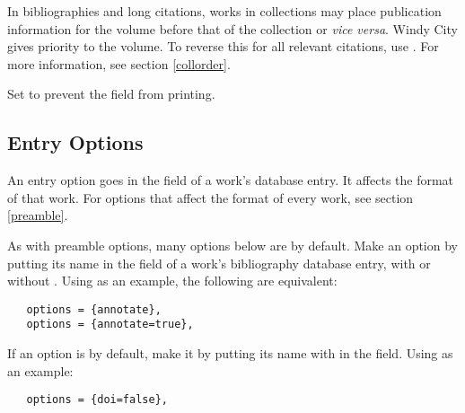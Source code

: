\documentclass[11pt,letterpaper,oneside]{article}
\begin{document}
\begin{optionlist}

\noindent In bibliographies and long citations, works in collections
may place publication information for the volume before that of the
collection or \textit{vice versa}. Windy City gives priority to the
volume. To reverse this for all relevant citations, use .
For more information, see section \ref{collorder}.


\noindent Set  to prevent the  field from
printing.

\end{optionlist}

\subsection{Entry Options}
\label{entry}

An entry option goes in the  field of a work's
database entry. It affects the format of that work. For options that
affect the format of every work, see section \ref{preamble}.

As with preamble options, many options below are  by
default. Make an option  by putting its name in the
 field of a work's bibliography database entry, with
or without . Using  as an example, the
following are equivalent:

\begin{verbatim}
   options = {annotate},
   options = {annotate=true},
\end{verbatim}

If an option is  by default, make it  by putting
its name with  in the  field. Using
 as an example:

\begin{verbatim}
   options = {doi=false},
\end{verbatim}
\end{document}
